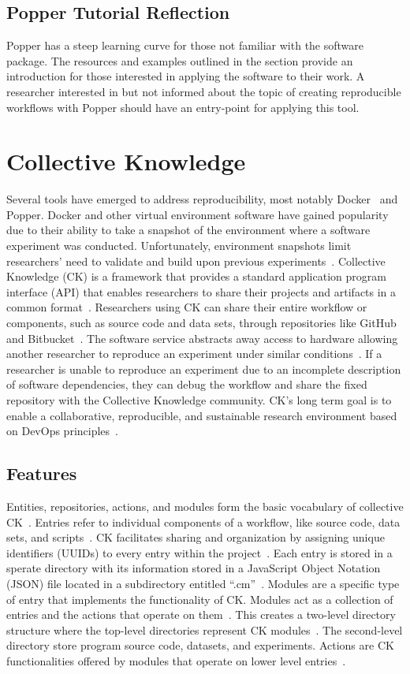\documentclass{IEEEtran}
\begin{document}


\subsection{Popper Tutorial Reflection}
Popper has a steep learning curve for those not familiar with the software package. The resources and examples outlined in the section provide an introduction for those interested in applying the software to their work. A researcher interested in but not informed about the topic of creating reproducible workflows with Popper should have an entry-point for applying this tool.

\section{Collective Knowledge}
Several tools have emerged to address reproducibility, most notably Docker~\cite{ITD} and Popper. Docker and other virtual environment software have gained popularity due to their ability to take a snapshot of the environment where a software experiment was conducted. Unfortunately, environment snapshots limit researchers' need to validate and build upon previous experiments~\cite{CKTS}.
Collective Knowledge (CK) is a framework that provides a standard application program interface (API) that enables researchers to share their projects and artifacts in a common format~\cite{ctuning/ck}. Researchers using CK can share their entire workflow or components, such as source code and data sets, through repositories like GitHub and Bitbucket~\cite{CKTS}. The software service abstracts away access to hardware allowing another researcher to reproduce an experiment under similar conditions~\cite{CKTS}. If a researcher is unable to reproduce an experiment due to an incomplete description of software dependencies, they can debug the workflow and share the fixed repository with the Collective Knowledge community. 
CK's long term goal is to enable a collaborative, reproducible, and sustainable research environment based on DevOps principles~\cite{ctuning/ck}.

\subsection{Features}
Entities, repositories, actions, and modules form the basic vocabulary of collective CK~\cite{CKTS}. Entries refer to individual components of a workflow, like source code, data sets, and scripts~\cite{aboutCK}. CK facilitates sharing and organization by assigning unique identifiers (UUIDs) to every entry within the project~\cite{aboutCK}. Each entry is stored in a sperate directory with its information stored in a JavaScript Object Notation (JSON) file located in a subdirectory entitled “.cm”~\cite{ctuning/ck}. Modules are a specific type of entry that implements the functionality of CK. Modules act as a collection of entries and the actions that operate on them~\cite{aboutCK}. This creates a two-level directory structure where the top-level directories represent CK modules~\cite{aboutCK}. The second-level directory store program source code, datasets, and experiments. Actions are CK functionalities offered by modules that operate on lower level entries~\cite{aboutCK}. 
\end{document}
